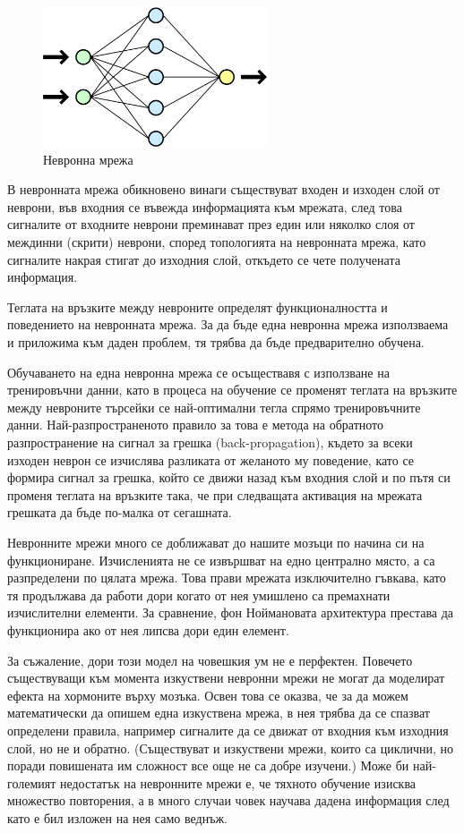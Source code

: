 \begin{figure}[H]
\centering
\includegraphics[width=250px]{Figures/Neuralnetwork.png}
\caption{Невронна мрежа}
\label{fig:NeuralNetwork}
\end{figure}

В невронната мрежа обикновено винаги съществуват входен и изходен слой от неврони, във входния се въвежда информацията към мрежата, след това сигналите от входните неврони преминават през един или няколко слоя от междинни (скрити) неврони, според топологията на невронната мрежа, като сигналите накрая стигат до изходния слой, откъдето се чете получената информация.

Теглата на връзките между невроните определят функционалността и поведението на невронната мрежа. За да бъде една невронна мрежа използваема и приложима към даден проблем, тя трябва да бъде предварително обучена.

Обучаването на една невронна мрежа се осъществавя с използване на тренировъчни данни, като в процеса на обучение се променят теглата на връзките между невроните търсейки се най-оптимални тегла спрямо тренировъчните данни. Най-разпространеното правило за това е метода на обратното разпространение на сигнал за грешка (back-propagation), където за всеки изходен неврон се изчислява разликата от желаното му поведение, като се формира сигнал за грешка, който се движи назад към входния слой и по пътя си променя теглата на връзките така, че при следващата активация на мрежата грешката да бъде по-малка от сегашната.

Невронните мрежи много се доближават до нашите мозъци по начина си на функциониране.  Изчисленията не се извършват на едно централно място, а са разпределени по цялата мрежа. Това прави мрежата изключително гъвкава, като тя продължава да работи дори когато от нея умишлено са премахнати изчислителни елементи. За сравнение, фон Ноймановата архитектура престава да функционира ако от нея липсва дори един елемент.

За съжаление, дори този модел на човешкия ум не е перфектен. Повечето съществуващи към момента изкуствени невронни мрежи не могат да моделират ефекта на хормоните върху мозъка. Освен това се оказва, че за да можем математически да опишем една изкуствена мрежа, в нея трябва да се спазват определени правила, например сигналите да се движат от входния към изходния слой, но не и обратно. (Съществуват и изкуствени мрежи, които са циклични, но поради повишената им сложност все още не са добре изучени.) Може би най-големият недостатък на невронните мрежи е, че тяхното обучение изисква множество повторения, а в много случаи човек научава дадена информация след като е бил изложен на нея само веднъж.

